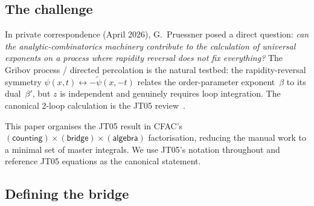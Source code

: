\documentclass[11pt,a4paper]{article}
\newcommand{\psidag}{\tilde\psi}
\theoremstyle{definition}
\theoremstyle{plain}
\begin{document}
\subsection{The challenge}

In private correspondence (April 2026), G.~Pruessner posed a direct
question: \emph{can the analytic-combinatorics machinery contribute to
the calculation of universal exponents on a process where rapidity
reversal does not fix everything?}  The Gribov process / directed
percolation \cite{Janssen1981,JanssenTauber2005} is the natural
testbed: the rapidity-reversal symmetry $\psi(x,t)
\leftrightarrow -\psidag(x,-t)$ relates the order-parameter
exponent~$\beta$ to its dual~$\beta'$, but $z$ is independent and
genuinely requires loop integration.  The canonical 2-loop
calculation is the JT05 review~\cite{JanssenTauber2005}.

This paper organises the JT05 result in CFAC's
$(\textsf{counting})\times(\textsf{bridge})\times(\textsf{algebra})$
factorisation, reducing the manual work to a minimal set of master
integrals.  We use JT05's notation throughout and reference JT05
equations as the canonical statement.

\subsection{Defining the bridge}\label{sec:bridge-def}
\end{document}
